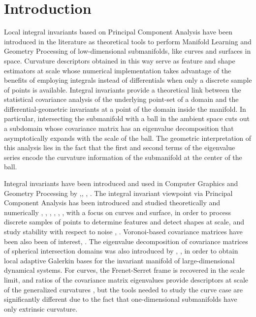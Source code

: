 \documentclass[letterpaper, reqno, 11pt]{amsart}
\theoremstyle{definition}
\theoremstyle{remark}
\numberwithin{equation}{section}
\begin{document}
\tableofcontents


\section{Introduction}\label{sec:intro}

Local integral invariants based on Principal Component Analysis have been introduced in the literature as theoretical tools to perform Manifold Learning and Geometry Processing of low-dimensional submanifolds, like curves and surfaces in space. Curvature descriptors obtained in this way serve as feature and shape estimators at scale whose numerical implementation takes advantage of the benefits of employing integrals instead of differentials when only a discrete sample of points is available. Integral invariants provide a theoretical link between the statistical covariance analysis of the underlying point-set of a domain and the differential-geometric invariants at a point of the domain inside the manifold. In particular, intersecting the submanifold with a ball in the ambient space cuts out a subdomain whose covariance matrix has an eigenvalue decomposition that asymptotically expands with the scale of the ball. The geometric interpretation of this analysis lies in the fact that the first and second terms of the eigenvalue series encode the curvature information of the submanifold at the center of the ball. 

Integral invariants have been introduced and used in Computer Graphics and Geometry Processing by \cite{connolly1986},\cite{cazals2003a, cazals2003b}, \cite{clarenz2003, clarenz2004}, \cite{manay2004, manay2006}. The integral invariant viewpoint via Principal Component Analysis has been introduced and studied theoretically and numerically \cite{alliez2007}, \cite{berkmann1994}, \cite{clarenz2003, clarenz2004}, \cite{hoppe1992}, \cite{manay2004}, \cite{pottmann2006}, with a focus on curves and surface, in order to process discrete samples of points to determine features and detect shapes at scale, and study stability with respect to noise \cite{lai2009}, \cite{pottmann2007, pottmann2008}. Voronoi-based covariance matrices have been also been of interest, \cite{merigot2009, merigot20011}.
The eigenvalue decomposition of covariance matrices of spherical intersection domains was also introduced by \cite{broomhead1991local}, \cite{solis1993, solis2000}, in order to obtain local adaptive Galerkin bases for the invariant manifold of large-dimensional dynamical systems. For curves, the Frenet-Serret frame is recovered in the scale limit, and ratios of the covariance matrix eigenvalues provide descriptors at scale of the generalized curvatures \cite{alvarez2017}, but the tools needed to study the curve case are significantly different due to the fact that one-dimensional submanifolds have only extrinsic curvature.
\end{document}
